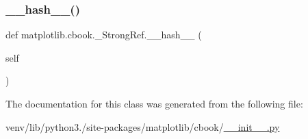 \mbox{\label{classmatplotlib_1_1cbook_1_1__StrongRef_a87a2f6713aa85738a9b967fddc44d5df}} 
\subsubsection{\texorpdfstring{\+\_\+\+\_\+hash\+\_\+\+\_\+()}{\_\_hash\_\_()}}
{\footnotesize\ttfamily def matplotlib.\+cbook.\+\_\+\+Strong\+Ref.\+\_\+\+\_\+hash\+\_\+\+\_\+ (\begin{DoxyParamCaption}\item[{}]{self }\end{DoxyParamCaption})}



The documentation for this class was generated from the following file\+:\begin{DoxyCompactItemize}
\item 
venv/lib/python3./site-\/packages/matplotlib/cbook/\hyperlink{venv_2lib_2python3_89_2site-packages_2matplotlib_2cbook_2____init_____8py}{\+\_\+\+\_\+init\+\_\+\+\_\+.\+py}\end{DoxyCompactItemize}
